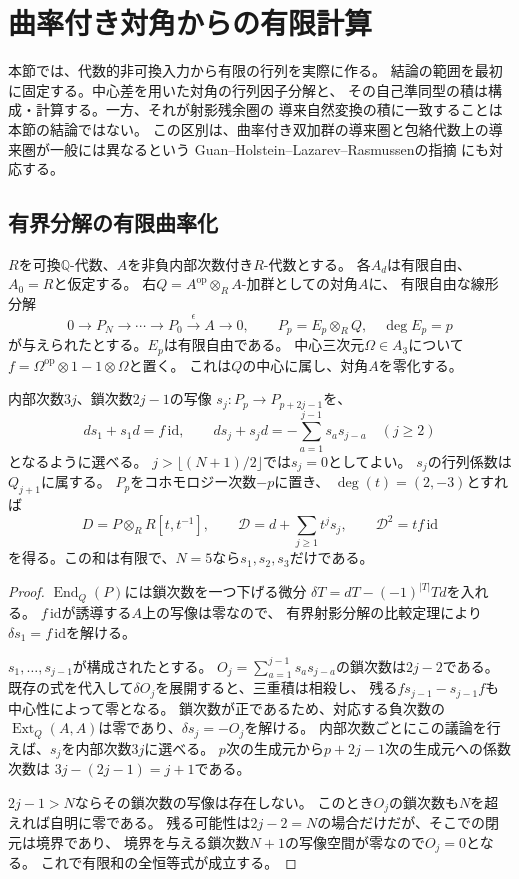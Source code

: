\section{曲率付き対角からの有限計算}
\label{cd:sec:finite-diagonal}

本節では、代数的非可換入力から有限の行列を実際に作る。
結論の範囲を最初に固定する。中心差を用いた対角の行列因子分解と、
その自己準同型の積は構成・計算する。一方、それが射影残余圏の
導来自然変換の積に一致することは本節の結論ではない。
この区別は、曲率付き双加群の導来圏と包絡代数上の導来圏が一般には異なるという
Guan--Holstein--Lazarev--Rasmussenの指摘\cite[Theorem~4.7, Theorem~6.14, Remark~6.16]{CDGHLR}
にも対応する。

\subsection{有界分解の有限曲率化}
$R$を可換$\mathbb Q$-代数、$A$を非負内部次数付き$R$-代数とする。
各$A_d$は有限自由、$A_0=R$と仮定する。
右$Q=A^{\mathrm{op}}\otimes_R A$-加群としての対角$A$に、
有限自由な線形分解
\[
 0\longrightarrow P_N\longrightarrow\cdots\longrightarrow P_0
 \xrightarrow{\epsilon} A\longrightarrow0,\qquad
 P_p=E_p\otimes_R Q,\quad \deg E_p=p
\]
が与えられたとする。$E_p$は有限自由である。
中心三次元$\Omega\in A_3$について
$f=\Omega^{\mathrm{op}}\otimes1-1\otimes\Omega$と置く。
これは$Q$の中心に属し、対角$A$を零化する。

\begin{theorem}[有限個の高次ホモトピー]
\label{cd:thm:finite-curvature}
内部次数$3j$、鎖次数$2j-1$の写像
$s_j:P_p\to P_{p+2j-1}$を、
\[
 ds_1+s_1d=f\,\mathrm{id},\qquad
 ds_j+s_jd=-\sum_{a=1}^{j-1}s_as_{j-a}\quad(j\ge2)
\]
となるように選べる。
$j>\lfloor(N+1)/2\rfloor$では$s_j=0$としてよい。
$s_j$の行列係数は$Q_{j+1}$に属する。
$P_p$をコホモロジー次数$-p$に置き、
$\deg(t)=(2,-3)$とすれば
\[
 D=P\otimes_R R[t,t^{-1}],\qquad
 \mathcal D=d+\sum_{j\ge1}t^js_j,
 \qquad \mathcal D^2=tf\,\mathrm{id}
\]
を得る。この和は有限で、$N=5$なら$s_1,s_2,s_3$だけである。
\end{theorem}
\begin{proof}
$\operatorname{End}_Q(P)$には鎖次数を一つ下げる微分
$\delta T=dT-(-1)^{|T|}Td$を入れる。
$f\,\mathrm{id}$が誘導する$A$上の写像は零なので、
有界射影分解の比較定理により$\delta s_1=f\,\mathrm{id}$を解ける。

$s_1,\ldots,s_{j-1}$が構成されたとする。
$O_j=\sum_{a=1}^{j-1}s_as_{j-a}$の鎖次数は$2j-2$である。
既存の式を代入して$\delta O_j$を展開すると、三重積は相殺し、
残る$f s_{j-1}-s_{j-1}f$も中心性によって零となる。
鎖次数が正であるため、対応する負次数の
$\operatorname{Ext}_Q(A,A)$は零であり、$\delta s_j=-O_j$を解ける。
内部次数ごとにこの議論を行えば、$s_j$を内部次数$3j$に選べる。
$p$次の生成元から$p+2j-1$次の生成元への係数次数は
$3j-(2j-1)=j+1$である。

$2j-1>N$ならその鎖次数の写像は存在しない。
このとき$O_j$の鎖次数も$N$を超えれば自明に零である。
残る可能性は$2j-2=N$の場合だけだが、そこでの閉元は境界であり、
境界を与える鎖次数$N+1$の写像空間が零なので$O_j=0$となる。
これで有限和の全恒等式が成立する。
\end{proof}

